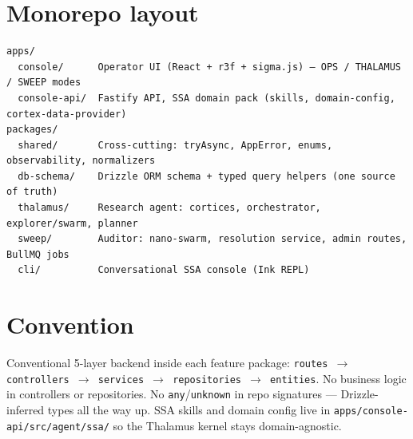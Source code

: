 




\makespecheader

\section{Monorepo layout}

\begin{lstlisting}
apps/
  console/      Operator UI (React + r3f + sigma.js) — OPS / THALAMUS / SWEEP modes
  console-api/  Fastify API, SSA domain pack (skills, domain-config, cortex-data-provider)
packages/
  shared/       Cross-cutting: tryAsync, AppError, enums, observability, normalizers
  db-schema/    Drizzle ORM schema + typed query helpers (one source of truth)
  thalamus/     Research agent: cortices, orchestrator, explorer/swarm, planner
  sweep/        Auditor: nano-swarm, resolution service, admin routes, BullMQ jobs
  cli/          Conversational SSA console (Ink REPL)
\end{lstlisting}

\section{Convention}

Conventional 5-layer backend inside each feature package: \texttt{routes $\to$ controllers $\to$ services $\to$ repositories $\to$ entities}. No business logic in controllers or repositories. No \texttt{any}/\texttt{unknown} in repo signatures --- Drizzle-inferred types all the way up. SSA skills and domain config live in \texttt{apps/console-api/src/agent/ssa/} so the Thalamus kernel stays domain-agnostic.



